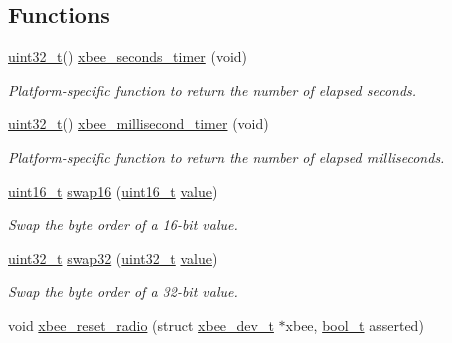 \subsection*{Functions}
\begin{DoxyCompactItemize}
\item 
\hyperlink{group__hal__dos_ga09a1e304d66d35dd47daffee9731edaa}{uint32\-\_\-t}() \hyperlink{group__hal__hcs08_ga68237f552f0e9a1d548516af35cacbc9}{xbee\-\_\-seconds\-\_\-timer} (void)
\begin{DoxyCompactList}\small\item\em Platform-\/specific function to return the number of elapsed seconds. \end{DoxyCompactList}\item 
\hyperlink{group__hal__dos_ga09a1e304d66d35dd47daffee9731edaa}{uint32\-\_\-t}() \hyperlink{group__hal__hcs08_ga22b4e3df788254ca5f8530e9aee58515}{xbee\-\_\-millisecond\-\_\-timer} (void)
\begin{DoxyCompactList}\small\item\em Platform-\/specific function to return the number of elapsed milliseconds. \end{DoxyCompactList}\item 
\hyperlink{group__hal_ga5a8b2dc9e45a9ee81a94ef304fb62505}{uint16\-\_\-t} \hyperlink{group__hal__hcs08_ga490209526172903494641bdac55db46e}{swap16} (\hyperlink{group__hal_ga5a8b2dc9e45a9ee81a94ef304fb62505}{uint16\-\_\-t} \hyperlink{group__zcl_ga1ed5b151a90f7e99af8cca2e6875ddf4}{value})
\begin{DoxyCompactList}\small\item\em Swap the byte order of a 16-\/bit value. \end{DoxyCompactList}\item 
\hyperlink{group__hal__dos_ga09a1e304d66d35dd47daffee9731edaa}{uint32\-\_\-t} \hyperlink{group__hal__hcs08_ga5bdbc60a02db00841f567d1ade52f877}{swap32} (\hyperlink{group__hal__dos_ga09a1e304d66d35dd47daffee9731edaa}{uint32\-\_\-t} \hyperlink{group__zcl_ga1ed5b151a90f7e99af8cca2e6875ddf4}{value})
\begin{DoxyCompactList}\small\item\em Swap the byte order of a 32-\/bit value. \end{DoxyCompactList}\item 
\hypertarget{group__hal__hcs08_ga482f4962318807aab3c24b9f0bf9af82}{void \hyperlink{group__hal__hcs08_ga482f4962318807aab3c24b9f0bf9af82}{xbee\-\_\-reset\-\_\-radio} (struct \hyperlink{structxbee__dev__t}{xbee\-\_\-dev\-\_\-t} $\ast$xbee, \hyperlink{group__hal_ga04dd5074964518403bf944f2b240a5f8}{bool\-\_\-t} asserted)}\label{group__hal__hcs08_ga482f4962318807aab3c24b9f0bf9af82}


\end{DoxyCompactItemize}
